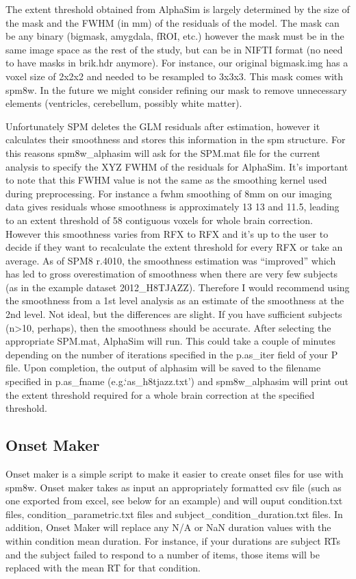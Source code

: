 \documentclass[12pt]{article}
\begin{document}
The extent threshold obtained from AlphaSim is largely determined by the size of the mask and the FWHM (in mm) of the residuals of the model. The mask can be any binary (bigmask, amygdala, fROI, etc.) however the mask must be in the same image space as the rest of the study, but can be in NIFTI format (no need to have masks in brik.hdr anymore). For instance, our original bigmask.img has a voxel size of 2x2x2 and needed to be resampled to 3x3x3. This mask comes with spm8w. In the future we might consider refining our mask to remove unnecessary elements (ventricles, cerebellum, possibly white matter).

Unfortunately SPM deletes the GLM residuals after estimation, however it calculates their smoothness and stores this information in the spm structure. For this reasons spm8w\_alphasim will ask for the SPM.mat file for the current analysis to specify the XYZ FWHM of the residuals for AlphaSim. It’s important to note that this FWHM value is not the same as the smoothing kernel used during preprocessing. For instance a fwhm smoothing of 8mm on our imaging data gives residuals whose smoothness is approximately 13 13 and 11.5, leading to an extent threshold of 58 contiguous voxels for whole brain correction. However this smoothness varies from RFX to RFX and it’s up to the user to decide if they want to recalculate the extent threshold for every RFX or take an average. As of SPM8 r.4010, the smoothness estimation was “improved” which has led to gross overestimation of smoothness when there are very few subjects (as in the example dataset 2012\_H8TJAZZ). Therefore I would recommend using the smoothness from a 1st level analysis as an estimate of the smoothness at the 2nd level. Not ideal, but the differences are slight. If you have sufficient subjects (n>10, perhaps), then the smoothness should be accurate. 
After selecting the appropriate SPM.mat, AlphaSim will run. This could take a couple of minutes depending on the number of iterations specified in the p.as\_iter field of your P file. Upon completion, the output of alphasim will be saved to the filename specified in p.as\_fname (e.g.‘as\_h8tjazz.txt’) and spm8w\_alphasim will print out the extent threshold required for a whole brain correction at the specified threshold. 

\subsection{Onset Maker}
Onset maker is a simple script to make it easier to create onset files for use with spm8w. Onset maker takes as input an appropriately formatted csv file (such as one exported from excel, see below for an example) and will ouput condition.txt files, condition\_parametric.txt files and subject\_condition\_duration.txt files. In addition, Onset Maker will replace any N/A or NaN duration values with the within condition mean duration. For instance, if your durations are subject RTs and the subject failed to respond to a number of items, those items will be replaced with the mean RT for that condition.
\end{document}
